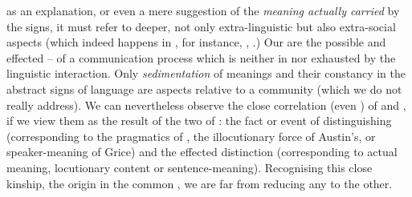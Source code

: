 {  as an explanation, or even a mere suggestion of the {\em meaning actually
    carried} by the signs, it must refer to deeper, not only extra-linguistic
  but also extra-social aspects (which indeed happens in , for instance, , .)
  Our  are the possible and effected  --
   of a communication process which is neither  in
  nor exhausted by the linguistic interaction. Only {\em sedimentation} of
  meanings and their constancy in the abstract signs of language are aspects
  relative to a community (which we do not really address).  We can nevertheless
  observe the close correlation (even \equin) of  and , if
  we view them as the result of  the two  of
  : the fact or event of distinguishing (corresponding to the
  pragmatics of , the {illocutionary force} of Austin's, or
  speaker-meaning of Grice) and the effected distinction (corresponding to
  actual meaning, {locutionary content} or sentence-meaning). Recognising this
  close kinship, the origin in the common \nexus, we are far from reducing any
   to the other.\label{ftnt:meaningUse}}

